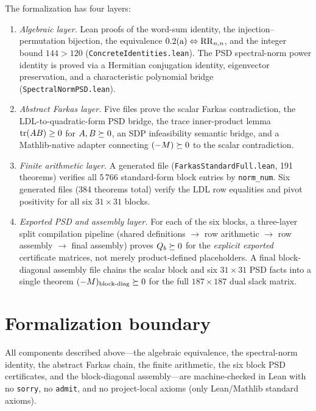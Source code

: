 \noindent
The formalization has four layers:
\begin{enumerate}[label=(\roman*),leftmargin=2em,itemsep=3pt]
  \item \emph{Algebraic layer.}  Lean proofs of the word-sum identity,
    the injection--permutation bijection, the equivalence
    $\text{0.2(a)}\Leftrightarrow\mathrm{RR}_{n,n}$, and the integer bound
    $144>120$ (\texttt{ConcreteIdentities.lean}).  The PSD
    spectral-norm power identity is proved via a Hermitian
    conjugation identity, eigenvector preservation, and a
    characteristic polynomial bridge
    (\texttt{SpectralNormPSD.lean}).

  \item \emph{Abstract Farkas layer.}  Five files prove the scalar
    Farkas contradiction, the LDL-to-quadratic-form PSD bridge,
    the trace inner-product lemma $\operatorname{tr}(AB)\ge 0$ for $A,B\succeq 0$,
    an SDP infeasibility semantic bridge, and a Mathlib-native
    adapter connecting $(-M)\succeq 0$ to the scalar contradiction.

  \item \emph{Finite arithmetic layer.}  A generated file
    (\texttt{FarkasStandardFull.lean}, 191 theorems) verifies all
    5\,766 standard-form block entries by \texttt{norm\_num}.
    Six generated files (384 theorems total) verify the LDL
    row equalities and pivot positivity for all six $31\times 31$
    blocks.

  \item \emph{Exported PSD and assembly layer.}  For each of the six
    blocks, a three-layer split compilation pipeline
    (shared definitions $\to$ row arithmetic $\to$ row assembly
    $\to$ final assembly) proves $Q_b\succeq 0$ for the \emph{explicit
    exported} certificate matrices, not merely product-defined
    placeholders.  A final block-diagonal assembly file chains
    the scalar block and six $31\times 31$ PSD facts into a
    single theorem $(-M)_{\text{block-diag}}\succeq 0$ for the full
    $187\times 187$ dual slack matrix.
\end{enumerate}

\section{Formalization boundary}\label{sec:boundary}

All components described above---the algebraic equivalence, the
spectral-norm identity, the abstract Farkas chain, the finite
arithmetic, the six block PSD certificates, and the block-diagonal
assembly---are machine-checked in Lean with no \texttt{sorry},
no \texttt{admit}, and no project-local axioms (only Lean/Mathlib
standard axioms).


